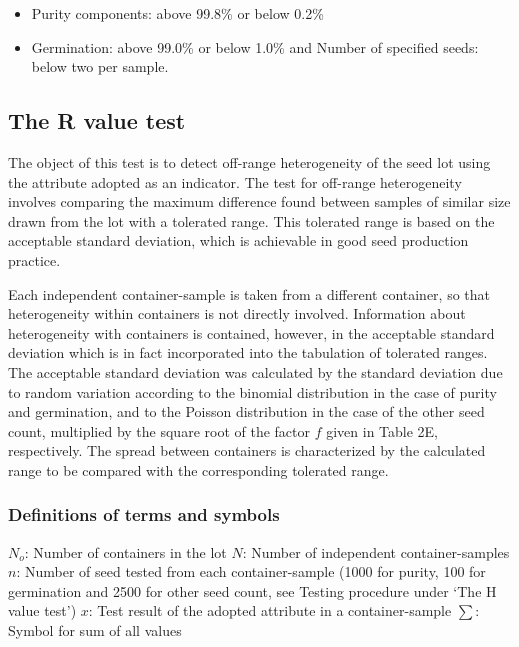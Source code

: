 \documentclass[]{book}
\providecommand{\tightlist}{%
  \setlength{\itemsep}{0pt}\setlength{\parskip}{0pt}}
\begin{document}
\begin{itemize}
\tightlist
\item
  Purity components: above 99.8\% or below 0.2\%
\item
  Germination: above 99.0\% or below 1.0\% and Number of specified
  seeds: below two per sample.
\end{itemize}

\subsection{The R value test}\label{the-r-value-test}

The object of this test is to detect off-range heterogeneity of the seed
lot using the attribute adopted as an indicator. The test for off-range
heterogeneity involves comparing the maximum difference found between
samples of similar size drawn from the lot with a tolerated range. This
tolerated range is based on the acceptable standard deviation, which is
achievable in good seed production practice.

Each independent container-sample is taken from a different container,
so that heterogeneity within containers is not directly involved.
Information about heterogeneity with containers is contained, however,
in the acceptable standard deviation which is in fact incorporated into
the tabulation of tolerated ranges. The acceptable standard deviation
was calculated by the standard deviation due to random variation
according to the binomial distribution in the case of purity and
germination, and to the Poisson distribution in the case of the other
seed count, multiplied by the square root of the factor \(f\) given in
Table 2E, respectively. The spread between containers is characterized
by the calculated range to be compared with the corresponding tolerated
range.

\subsubsection{Definitions of terms and
symbols}\label{definitions-of-terms-and-symbols-1}

\(N_o\): Number of containers in the lot \(N\): Number of independent
container-samples \(n\): Number of seed tested from each
container-sample (1000 for purity, 100 for germination and 2500 for
other seed count, see Testing procedure under `The H value test') \(x\):
Test result of the adopted attribute in a container-sample \(\sum\):
Symbol for sum of all values
\end{document}
